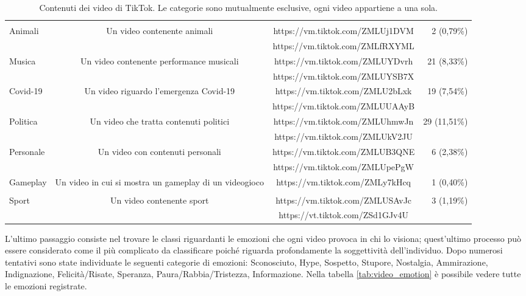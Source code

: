 \begin{table*}[htb]
\begin{tabular}{l c c r}
                & & & \\
        Animali & Un video contenente animali & https://vm.tiktok.com/ZMLUj1DVM & 2 (0,79\%) \\
                & & https://vm.tiktok.com/ZMLfRXYML & \\
        Musica & Un video contenente performance musicali & https://vm.tiktok.com/ZMLUYDvrh & 21 (8,33\%) \\
                & & https://vm.tiktok.com/ZMLUYSB7X & \\
        Covid-19 & Un video riguardo l'emergenza Covid-19 & https://vm.tiktok.com/ZMLU2bLxk & 19 (7,54\%) \\
                & & https://vm.tiktok.com/ZMLUUAAyB & \\
        Politica & Un video che tratta contenuti politici & https://vm.tiktok.com/ZMLUhmwJn & 29 (11,51\%) \\
                & & https://vm.tiktok.com/ZMLUkV2JU & \\
        Personale & Un video con contenuti personali & https://vm.tiktok.com/ZMLUB3QNE & 6 (2,38\%) \\
                & & https://vm.tiktok.com/ZMLUpePgW & \\
        Gameplay & Un video in cui si mostra un gameplay di un videogioco & https://vm.tiktok.com/ZMLy7kHcq & 1 (0,40\%) \\
                & & & \\
        Sport & Un video contenente sport & https://vm.tiktok.com/ZMLUSAvJc & 3 (1,19\%) \\
                & & https://vt.tiktok.com/ZSd1GJv4U & \\
        \hline
    \end{tabular}
    \caption{Contenuti dei video di TikTok. Le categorie sono mutualmente esclusive, ogni video appartiene a una sola.}
    \label{tab:video_content}
\end{table*}

L'ultimo passaggio consiste nel trovare le classi riguardanti le emozioni che ogni video provoca in chi lo visiona; quest'ultimo 
processo può essere considerato come il più complicato da classificare poiché riguarda profondamente la soggettività dell'individuo. 
Dopo numerosi tentativi sono state individuate le seguenti categorie di emozioni: Sconosciuto, Hype, Sospetto, Stupore, Nostalgia, 
Ammirazione, Indignazione, Felicità/Risate, Speranza, Paura/Rabbia/Tristezza, Informazione.
Nella tabella \ref{tab:video_emotion} è possibile vedere tutte le emozioni registrate.

